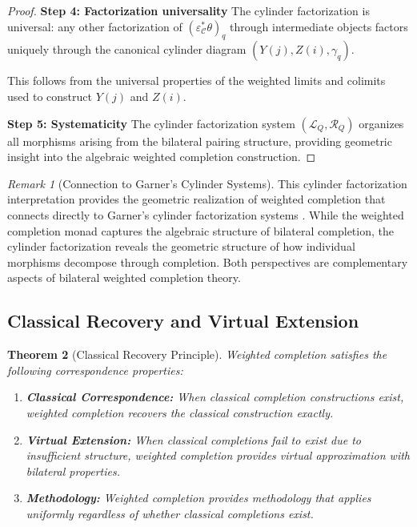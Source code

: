 \documentclass[11pt]{article}
\theoremstyle{plain}
\newtheorem{theorem}{Theorem}[section]
\theoremstyle{definition}
\theoremstyle{remark}
\newtheorem{remark}[theorem]{Remark}
\newcommand{\C}{\mathcal{C}}
\begin{document}
\begin{proof}
\textbf{Step 4: Factorization universality}
The cylinder factorization is universal: any other factorization of $(\varepsilon_\C^* \theta)_q$ through intermediate objects factors uniquely through the canonical cylinder diagram $(Y(j), Z(i), \gamma_q)$.

This follows from the universal properties of the weighted limits and colimits used to construct $Y(j)$ and $Z(i)$.

\textbf{Step 5: Systematicity}
The cylinder factorization system $(\mathcal{L}_Q, \mathcal{R}_Q)$ organizes all morphisms arising from the bilateral pairing structure, providing geometric insight into the algebraic weighted completion construction.
\end{proof}

\begin{remark}[Connection to Garner's Cylinder Systems]
This cylinder factorization interpretation provides the geometric realization of weighted completion that connects directly to Garner's cylinder factorization systems \cite{garner2018cylinder}. While the weighted completion monad captures the algebraic structure of bilateral completion, the cylinder factorization reveals the geometric structure of how individual morphisms decompose through completion. Both perspectives are complementary aspects of bilateral weighted completion theory.
\end{remark}

\subsection{Classical Recovery and Virtual Extension}

\begin{theorem}[Classical Recovery Principle]\label{thm:classical-recovery}
Weighted completion satisfies the following correspondence properties:

\begin{enumerate}
\item \textbf{Classical Correspondence:} When classical completion constructions exist, weighted completion recovers the classical construction exactly.

\item \textbf{Virtual Extension:} When classical completions fail to exist due to insufficient structure, weighted completion provides virtual approximation with bilateral properties.

\item \textbf{Methodology:} Weighted completion provides methodology that applies uniformly regardless of whether classical completions exist.
\end{enumerate}
\end{theorem}
\end{document}
